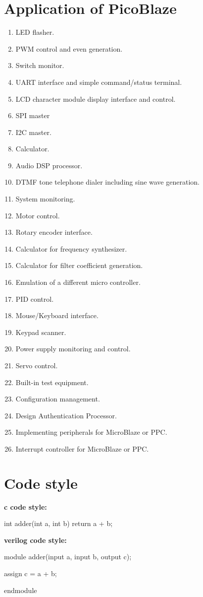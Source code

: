 \section{Application of PicoBlaze}
\begin{enumerate}
\item LED flasher.
\item PWM control and even generation.
\item Switch monitor.
\item UART interface and simple command/status terminal.
\item LCD character module display interface and control.
\item SPI master
\item I2C master.
\item Calculator.
\item Audio DSP processor.
\item DTMF tone telephone dialer including sine wave generation.
\item System monitoring.
\item Motor control.
\item Rotary encoder interface.
\item Calculator for frequency synthesizer.
\item Calculator for filter coefficient generation.
\item Emulation of a different micro controller.
\item PID control.
\item Mouse/Keyboard interface.
\item Keypad scanner.
\item Power supply monitoring and control.
\item Servo control.
\item Built-in test equipment.
\item Configuration management.
\item Design Authentication Processor.
\item Implementing peripherals for MicroBlaze or PPC.
\item Interrupt controller for MicroBlaze or PPC.
\end{enumerate}

\section{Code style}
\textbf{c code style:}
\begin{ccode}
int adder(int a, int b)
{
    return a + b;
}
\end{ccode}

\textbf{verilog code style:}
\begin{vcode}
module adder(input a, 
        input b,
        output c);

assign c = a + b;

endmodule
\end{vcode}


